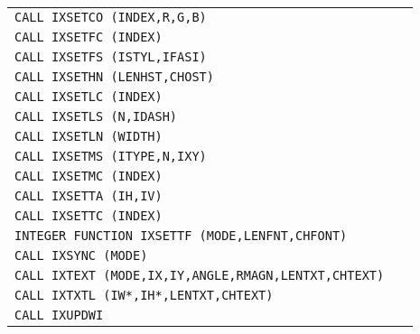 \begin{longtable}{|>{\small\tt}p{.87\linewidth}r|}
CALL IXSETCO (INDEX,R,G,B)                            & \pageref{IXSETCO}     \\
CALL IXSETFC (INDEX)                                  & \pageref{IXSETFC}     \\
CALL IXSETFS (ISTYL,IFASI)                            & \pageref{IXSETFS}     \\
CALL IXSETHN (LENHST,CHOST)                           & \pageref{IXSETHN}     \\
CALL IXSETLC (INDEX)                                  & \pageref{IXSETLC}     \\
CALL IXSETLS (N,IDASH)                                & \pageref{IXSETLS}     \\
CALL IXSETLN (WIDTH)                                  & \pageref{IXSETLN}     \\
CALL IXSETMS (ITYPE,N,IXY)                            & \pageref{IXSETMS}     \\
CALL IXSETMC (INDEX)                                  & \pageref{IXSETMC}     \\
CALL IXSETTA (IH,IV)                                  & \pageref{IXSETTA}     \\
CALL IXSETTC (INDEX)                                  & \pageref{IXSETTC}     \\
INTEGER FUNCTION IXSETTF (MODE,LENFNT,CHFONT)         & \pageref{IXSETTF}     \\
CALL IXSYNC (MODE)                                    & \pageref{IXSYNC}      \\
CALL IXTEXT (MODE,IX,IY,ANGLE,RMAGN,LENTXT,CHTEXT)    & \pageref{IXTEXT}      \\
CALL IXTXTL (IW*,IH*,LENTXT,CHTEXT)                   & \pageref{IXTXTL}      \\
CALL IXUPDWI                                          & \pageref{IXUPDWI}     \\
\end{longtable}
